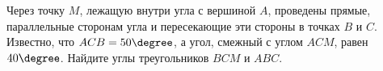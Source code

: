 \begin{ex}
	\begin{condition}
		Через точку \( M  \), лежащую внутри угла с вершиной \( A \), проведены прямые, параллельные сторонам угла и пересекающие эти стороны в точках \( B  \) и \( C \). Известно, что \( ACB = 50\degree \),	а угол, смежный с углом \( ACM  \), равен \( 40\degree\). Найдите углы треугольников \( BCM  \) и \( ABC \).
	\end{condition}
\end{ex}